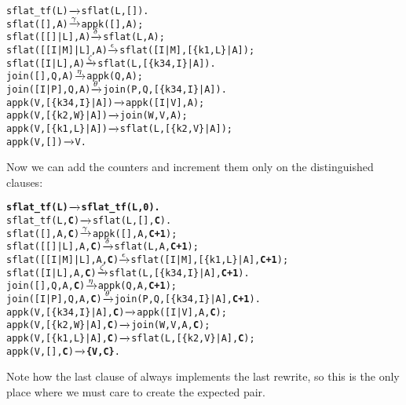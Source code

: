 \begin{alltt}
sflat_tf(L)         \(\smashedrightarrow{\phantom{\gamma}}\) sflat(L,[]).
sflat(       [],A)  \(\smashedrightarrow{\gamma}\) appk([],A);
sflat(   [[]|L],A)  \(\smashedrightarrow{\delta}\) sflat(L,A);
sflat([[I|M]|L],A)  \(\smashedrightarrow{\epsilon}\) sflat([I|M],[\{k1,L\}|A]);
sflat(    [I|L],A)  \(\smashedrightarrow{\zeta}\) sflat(L,[\{k34,I\}|A]).
join(   [],Q,A)     \(\smashedrightarrow{\eta}\) appk(Q,A);
join([I|P],Q,A)     \(\smashedrightarrow{\theta}\) join(P,Q,[\{k34,I\}|A]).
appk(V,[\{k34,I\}|A]) \(\smashedrightarrow{\phantom{\theta}}\) appk([I|V],A);
appk(V,[\{k2,W\}|A])  \(\smashedrightarrow{\phantom{\theta}}\) join(W,V,A);
appk(V,[\{k1,L\}|A])  \(\smashedrightarrow{\phantom{\theta}}\) sflat(L,[\{k2,V\}|A]);
appk(V,        [])  \(\smashedrightarrow{\phantom{\theta}}\) V.
\end{alltt}
Now we can add the counters and increment them only on the
distinguished clauses:
\begin{alltt}
\textbf{sflat_tf(L)           \(\smashedrightarrow{\phantom{\gamma}}\) sflat_tf(L,0).}\hfill% \emph{New}
sflat_tf(L,\textbf{C})         \(\smashedrightarrow{\phantom{\gamma}}\) sflat(L,[],\textbf{C}).
sflat(       [],A,\textbf{C})  \(\smashedrightarrow{\gamma}\) appk([],A,\textbf{C+1});
sflat(   [[]|L],A,\textbf{C})  \(\smashedrightarrow{\delta}\) sflat(L,A,\textbf{C+1});
sflat([[I|M]|L],A,\textbf{C})  \(\smashedrightarrow{\epsilon}\) sflat([I|M],[\{k1,L\}|A],\textbf{C+1});
sflat(    [I|L],A,\textbf{C})  \(\smashedrightarrow{\zeta}\) sflat(L,[\{k34,I\}|A],\textbf{C+1}).
join(   [],Q,A,\textbf{C})     \(\smashedrightarrow{\eta}\) appk(Q,A,\textbf{C+1});
join([I|P],Q,A,\textbf{C})     \(\smashedrightarrow{\theta}\) join(P,Q,[\{k34,I\}|A],\textbf{C+1}).
appk(V,[\{k34,I\}|A],\textbf{C}) \(\smashedrightarrow{\phantom{\theta}}\) appk([I|V],A,\textbf{C});
appk(V,[\{k2,W\}|A],\textbf{C})  \(\smashedrightarrow{\phantom{\theta}}\) join(W,V,A,\textbf{C});
appk(V,[\{k1,L\}|A],\textbf{C})  \(\smashedrightarrow{\phantom{\theta}}\) sflat(L,[\{k2,V\}|A],\textbf{C});
appk(V,        [],\textbf{C})  \(\smashedrightarrow{\phantom{\theta}}\) \textbf{\{V,C\}}.
\end{alltt}
Note how the last clause of  always implements the
last rewrite, so this is the only place where we must care to create
the expected pair.

